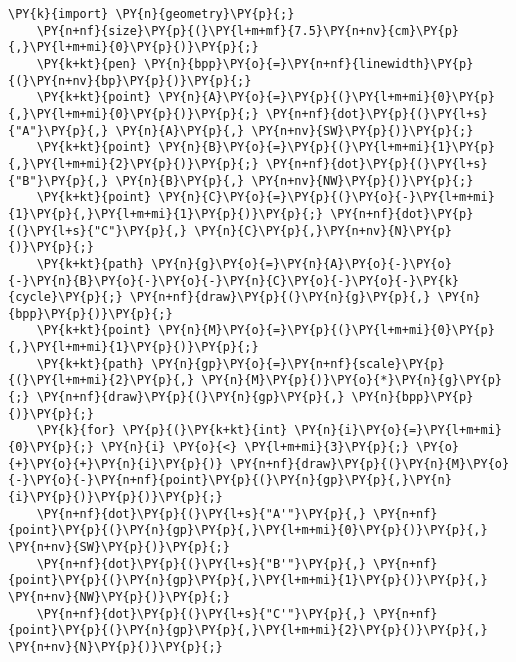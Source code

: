 \begin{Verbatim}[commandchars=\\\{\}]
    \PY{k}{import} \PY{n}{geometry}\PY{p}{;}
    \PY{n+nf}{size}\PY{p}{(}\PY{l+m+mf}{7.5}\PY{n+nv}{cm}\PY{p}{,}\PY{l+m+mi}{0}\PY{p}{)}\PY{p}{;}
    \PY{k+kt}{pen} \PY{n}{bpp}\PY{o}{=}\PY{n+nf}{linewidth}\PY{p}{(}\PY{n+nv}{bp}\PY{p}{)}\PY{p}{;}
    \PY{k+kt}{point} \PY{n}{A}\PY{o}{=}\PY{p}{(}\PY{l+m+mi}{0}\PY{p}{,}\PY{l+m+mi}{0}\PY{p}{)}\PY{p}{;} \PY{n+nf}{dot}\PY{p}{(}\PY{l+s}{"A"}\PY{p}{,} \PY{n}{A}\PY{p}{,} \PY{n+nv}{SW}\PY{p}{)}\PY{p}{;}
    \PY{k+kt}{point} \PY{n}{B}\PY{o}{=}\PY{p}{(}\PY{l+m+mi}{1}\PY{p}{,}\PY{l+m+mi}{2}\PY{p}{)}\PY{p}{;} \PY{n+nf}{dot}\PY{p}{(}\PY{l+s}{"B"}\PY{p}{,} \PY{n}{B}\PY{p}{,} \PY{n+nv}{NW}\PY{p}{)}\PY{p}{;}
    \PY{k+kt}{point} \PY{n}{C}\PY{o}{=}\PY{p}{(}\PY{o}{-}\PY{l+m+mi}{1}\PY{p}{,}\PY{l+m+mi}{1}\PY{p}{)}\PY{p}{;} \PY{n+nf}{dot}\PY{p}{(}\PY{l+s}{"C"}\PY{p}{,} \PY{n}{C}\PY{p}{,}\PY{n+nv}{N}\PY{p}{)}\PY{p}{;}
    \PY{k+kt}{path} \PY{n}{g}\PY{o}{=}\PY{n}{A}\PY{o}{-}\PY{o}{-}\PY{n}{B}\PY{o}{-}\PY{o}{-}\PY{n}{C}\PY{o}{-}\PY{o}{-}\PY{k}{cycle}\PY{p}{;} \PY{n+nf}{draw}\PY{p}{(}\PY{n}{g}\PY{p}{,} \PY{n}{bpp}\PY{p}{)}\PY{p}{;}
    \PY{k+kt}{point} \PY{n}{M}\PY{o}{=}\PY{p}{(}\PY{l+m+mi}{0}\PY{p}{,}\PY{l+m+mi}{1}\PY{p}{)}\PY{p}{;}
    \PY{k+kt}{path} \PY{n}{gp}\PY{o}{=}\PY{n+nf}{scale}\PY{p}{(}\PY{l+m+mi}{2}\PY{p}{,} \PY{n}{M}\PY{p}{)}\PY{o}{*}\PY{n}{g}\PY{p}{;} \PY{n+nf}{draw}\PY{p}{(}\PY{n}{gp}\PY{p}{,} \PY{n}{bpp}\PY{p}{)}\PY{p}{;}
    \PY{k}{for} \PY{p}{(}\PY{k+kt}{int} \PY{n}{i}\PY{o}{=}\PY{l+m+mi}{0}\PY{p}{;} \PY{n}{i} \PY{o}{<} \PY{l+m+mi}{3}\PY{p}{;} \PY{o}{+}\PY{o}{+}\PY{n}{i}\PY{p}{)} \PY{n+nf}{draw}\PY{p}{(}\PY{n}{M}\PY{o}{-}\PY{o}{-}\PY{n+nf}{point}\PY{p}{(}\PY{n}{gp}\PY{p}{,}\PY{n}{i}\PY{p}{)}\PY{p}{)}\PY{p}{;}
    \PY{n+nf}{dot}\PY{p}{(}\PY{l+s}{"A'"}\PY{p}{,} \PY{n+nf}{point}\PY{p}{(}\PY{n}{gp}\PY{p}{,}\PY{l+m+mi}{0}\PY{p}{)}\PY{p}{,} \PY{n+nv}{SW}\PY{p}{)}\PY{p}{;}
    \PY{n+nf}{dot}\PY{p}{(}\PY{l+s}{"B'"}\PY{p}{,} \PY{n+nf}{point}\PY{p}{(}\PY{n}{gp}\PY{p}{,}\PY{l+m+mi}{1}\PY{p}{)}\PY{p}{,} \PY{n+nv}{NW}\PY{p}{)}\PY{p}{;}
    \PY{n+nf}{dot}\PY{p}{(}\PY{l+s}{"C'"}\PY{p}{,} \PY{n+nf}{point}\PY{p}{(}\PY{n}{gp}\PY{p}{,}\PY{l+m+mi}{2}\PY{p}{)}\PY{p}{,} \PY{n+nv}{N}\PY{p}{)}\PY{p}{;}
\end{Verbatim}
